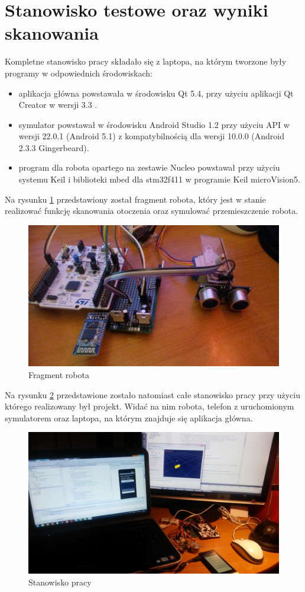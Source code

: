 \documentclass[a4paper,12pt]{article}
\begin{document}
\section{Stanowisko testowe oraz wyniki skanowania}
Kompletne stanowisko pracy składało się z laptopa, na którym tworzone były programy w odpowiednich środowiskach:
\begin{itemize}
\item aplikacja główna powstawała w środowisku Qt 5.4, przy użyciu aplikacji Qt Creator w wersji 3.3 . 
\item symulator powstawał w środowisku Android Studio 1.2 przy użyciu API w wersji 22.0.1 (Android 5.1) z kompatybilnością dla wersji 10.0.0 (Android 2.3.3 Gingerbeard).
\item program dla robota opartego na zestawie Nucleo powstawał przy użyciu systemu Keil i biblioteki mbed dla stm32f411 w programie Keil microVision5.
\end{itemize}
Na rysunku \ref{prac1} przedstawiony został fragment robota, który jest w stanie realizować funkcję skanowania otoczenia oraz symulować przemieszczenie robota. 
\begin{figure}[p]
\centering
\includegraphics[width=\textheight, angle=90]{prac1.jpg}
\caption{Fragment robota}
\label{prac1}
\end{figure}

Na rysunku \ref{prac2} przedstawione zostało natomiast całe stanowisko pracy przy użyciu którego realizowany był projekt. Widać na nim robota, telefon z uruchomionym symulatorem oraz laptopa, na którym znajduje się aplikacja główna. 
\begin{figure}[p]
\centering
\includegraphics[width=\textheight, angle=90]{prac2.jpg}
\caption{Stanowisko pracy}
\label{prac2}
\end{figure}
\end{document}

